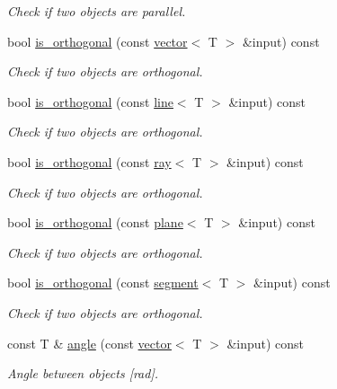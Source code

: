 \begin{DoxyCompactItemize}
\begin{DoxyCompactList}\small\item\em Check if two objects are parallel. \end{DoxyCompactList}\item 
bool \hyperlink{classddd_1_1ray_ad8713b370161724762d493309d6a6c97}{is\+\_\+orthogonal} (const \hyperlink{classddd_1_1vector}{vector}$<$ T $>$ \&input) const
\begin{DoxyCompactList}\small\item\em Check if two objects are orthogonal. \end{DoxyCompactList}\item 
bool \hyperlink{classddd_1_1ray_a688a8099b97cf4b91df488a5679c386a}{is\+\_\+orthogonal} (const \hyperlink{classddd_1_1line}{line}$<$ T $>$ \&input) const
\begin{DoxyCompactList}\small\item\em Check if two objects are orthogonal. \end{DoxyCompactList}\item 
bool \hyperlink{classddd_1_1ray_a669c71b72c7222adae9fab86795e7305}{is\+\_\+orthogonal} (const \hyperlink{classddd_1_1ray}{ray}$<$ T $>$ \&input) const
\begin{DoxyCompactList}\small\item\em Check if two objects are orthogonal. \end{DoxyCompactList}\item 
bool \hyperlink{classddd_1_1ray_a4155c7217449831487cc48c6b0fae739}{is\+\_\+orthogonal} (const \hyperlink{classddd_1_1plane}{plane}$<$ T $>$ \&input) const
\begin{DoxyCompactList}\small\item\em Check if two objects are orthogonal. \end{DoxyCompactList}\item 
bool \hyperlink{classddd_1_1ray_a1e226d670f8e75a4fc77d0ee897d9fc5}{is\+\_\+orthogonal} (const \hyperlink{classddd_1_1segment}{segment}$<$ T $>$ \&input) const
\begin{DoxyCompactList}\small\item\em Check if two objects are orthogonal. \end{DoxyCompactList}\item 
const T \& \hyperlink{classddd_1_1ray_a01f164e76aedb3b4bb1e79cc9a989f0f}{angle} (const \hyperlink{classddd_1_1vector}{vector}$<$ T $>$ \&input) const
\begin{DoxyCompactList}\small\item\em Angle between objects \mbox{[}rad\mbox{]}. \end{DoxyCompactList}\item 

\end{DoxyCompactItemize}
